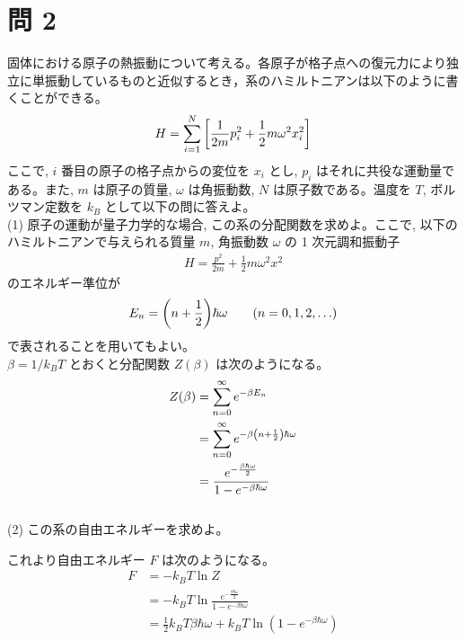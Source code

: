 \documentclass[uplatex,a4paper,dvipdfmx]{jsarticle}
\theoremstyle{definition}
\begin{document}
\section*{問 2}
固体における原子の熱振動について考える。各原子が格子点への復元力により独立に単振動しているものと近似するとき，系のハミルトニアンは以下のように書くことができる。
\begin{align}
  H = \sum_{i=1}^{N}\qty[\frac{1}{2m}p_i^2 + \frac{1}{2}m\omega^2x_i^2]
\end{align}
ここで, $i$ 番目の原子の格子点からの変位を $x_i$ とし, $p_i$ はそれに共役な運動量である。また, $m$ は原子の質量, $\omega$ は角振動数, $N$ は原子数である。温度を $T$, ボルツマン定数を $k_B$ として以下の問に答えよ。 \\

(1) 原子の運動が量子力学的な場合, この系の分配関数を求めよ。ここで, 以下のハミルトニアンで与えられる質量 $m$, 角振動数 $\omega$ の 1 次元調和振動子
\begin{align}
  H = \frac{p^2}{2m} + \frac{1}{2}m\omega^2x^2
\end{align}
のエネルギー準位が
\begin{align}
  E_n = \qty(n + \frac{1}{2})\hbar\omega \qquad (n = 0, 1, 2, \ldots)
\end{align}
で表されることを用いてもよい。 \\

$\beta = 1/k_BT$ とおくと分配関数 $Z(\beta)$ は次のようになる。
\begin{align}
  Z(\beta) & = \sum_{n=0}^{\infty}e^{-\beta E_n}                                 \\
           & = \sum_{n=0}^{\infty}e^{-\beta\qty(n + \frac{1}{2})\hbar\omega}     \\
           & = \frac{e^{-\frac{\beta\hbar\omega}{2}}}{1 - e^{-\beta\hbar\omega}}
\end{align} \\

(2) この系の自由エネルギーを求めよ。

これより自由エネルギー $F$ は次のようになる。
\begin{align}
  F & = -k_BT\ln Z                                                                 \\
    & = -k_BT\ln \frac{e^{-\frac{\beta\hbar\omega}{2}}}{1 - e^{-\beta\hbar\omega}} \\
    & = \frac{1}{2}k_BT\beta\hbar\omega + k_BT\ln(1 - e^{-\beta\hbar\omega})
\end{align}
\end{document}
